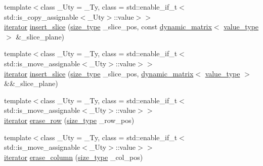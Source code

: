 \begin{DoxyCompactItemize}
\item 
{\footnotesize template$<$class \+\_\+\+Uty  = \+\_\+\+Ty, class  = std\+::enable\+\_\+if\+\_\+t$<$std\+::is\+\_\+copy\+\_\+assignable$<$\+\_\+\+Uty$>$\+::value$>$$>$ }\\\hyperlink{classcrsc_1_1dynamic__r3__tensor_a8da8f1c3ec1cde63d7693e41c9e7f496}{iterator} \hyperlink{classcrsc_1_1dynamic__r3__tensor_a61e81cfbb869936b8d2dafeb25b63bab}{insert\+\_\+slice} (\hyperlink{classcrsc_1_1dynamic__r3__tensor_a00e5f1f46f16d0c0ac1cffa6bd0fe862}{size\+\_\+type} \+\_\+slice\+\_\+pos, const \hyperlink{classcrsc_1_1dynamic__matrix}{dynamic\+\_\+matrix}$<$ \hyperlink{classcrsc_1_1dynamic__r3__tensor_ad7fb44388c819fb7947771da18bb625b}{value\+\_\+type} $>$ \&\+\_\+slice\+\_\+plane)
\item 
{\footnotesize template$<$class \+\_\+\+Uty  = \+\_\+\+Ty, class  = std\+::enable\+\_\+if\+\_\+t$<$std\+::is\+\_\+move\+\_\+assignable$<$\+\_\+\+Uty$>$\+::value$>$$>$ }\\\hyperlink{classcrsc_1_1dynamic__r3__tensor_a8da8f1c3ec1cde63d7693e41c9e7f496}{iterator} \hyperlink{classcrsc_1_1dynamic__r3__tensor_a7377053919f378941878ae6ac5cfcc47}{insert\+\_\+slice} (\hyperlink{classcrsc_1_1dynamic__r3__tensor_a00e5f1f46f16d0c0ac1cffa6bd0fe862}{size\+\_\+type} \+\_\+slice\+\_\+pos, \hyperlink{classcrsc_1_1dynamic__matrix}{dynamic\+\_\+matrix}$<$ \hyperlink{classcrsc_1_1dynamic__r3__tensor_ad7fb44388c819fb7947771da18bb625b}{value\+\_\+type} $>$ \&\&\+\_\+slice\+\_\+plane)
\item 
{\footnotesize template$<$class \+\_\+\+Uty  = \+\_\+\+Ty, class  = std\+::enable\+\_\+if\+\_\+t$<$std\+::is\+\_\+move\+\_\+assignable$<$\+\_\+\+Uty$>$\+::value$>$$>$ }\\\hyperlink{classcrsc_1_1dynamic__r3__tensor_a8da8f1c3ec1cde63d7693e41c9e7f496}{iterator} \hyperlink{classcrsc_1_1dynamic__r3__tensor_a66cc7682c7796a308bcb6092ab8d4277}{erase\+\_\+row} (\hyperlink{classcrsc_1_1dynamic__r3__tensor_a00e5f1f46f16d0c0ac1cffa6bd0fe862}{size\+\_\+type} \+\_\+row\+\_\+pos)
\item 
{\footnotesize template$<$class \+\_\+\+Uty  = \+\_\+\+Ty, class  = std\+::enable\+\_\+if\+\_\+t$<$std\+::is\+\_\+move\+\_\+assignable$<$\+\_\+\+Uty$>$\+::value$>$$>$ }\\\hyperlink{classcrsc_1_1dynamic__r3__tensor_a8da8f1c3ec1cde63d7693e41c9e7f496}{iterator} \hyperlink{classcrsc_1_1dynamic__r3__tensor_a132dec1b24e8e2ab20d9bb333e84d3ca}{erase\+\_\+column} (\hyperlink{classcrsc_1_1dynamic__r3__tensor_a00e5f1f46f16d0c0ac1cffa6bd0fe862}{size\+\_\+type} \+\_\+col\+\_\+pos)

\end{DoxyCompactItemize}
